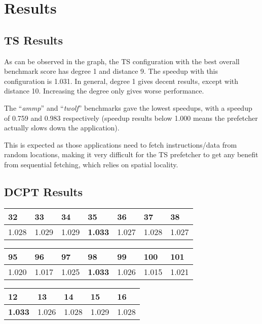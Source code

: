 \section{Results}
\label{sec:res}

\subsection{TS Results}

As can be observed in the graph, the TS configuration with the best
overall benchmark score has degree 1 and distance 9. The speedup with this configuration is 1.031. In general, degree 1 gives decent results, except with distance 10. Increasing the degree only gives worse performance.

The ``\emph{ammp}'' and ``\emph{twolf}'' benchmarks
gave the lowest speedups, with a speedup of 0.759 and 0.983 respectively (speedup
results below 1.000 means the prefetcher actually slows down the application).

This is expected as those applications need to fetch instructions/data from
random locations, making it very difficult for the TS prefetcher
to get any benefit from sequential fetching, which relies on spatial locality.

\subsection{DCPT Results}

\begin{table}[h]
\begin{tabular}{|l|l|l|l|l|l|l|}
\hline
32    & 33    & 34    & \textbf{35}    & 36    & 37    & 38    \\ \hline
1.028 & 1.029 & 1.029 & \textbf{1.033} & 1.027 & 1.028 & 1.027 \\ \hline
\end{tabular}
\end{table}

\begin{table}[h]
\begin{tabular}{|l|l|l|l|l|l|l|}
\hline
95    & 96    & 97    & \textbf{98}    & 99    & 100   & 101   \\ \hline
1.020 & 1.017 & 1.025 & \textbf{1.033} & 1.026 & 1.015 & 1.021 \\ \hline
\end{tabular}
\end{table}

\begin{table}[h]
\begin{tabular}{|l|l|l|l|l|}
\hline
\textbf{12}    & 13    & 14    & 15    & 16    \\ \hline
\textbf{1.033} & 1.026 & 1.028 & 1.029 & 1.028 \\ \hline
\end{tabular}
\end{table}




